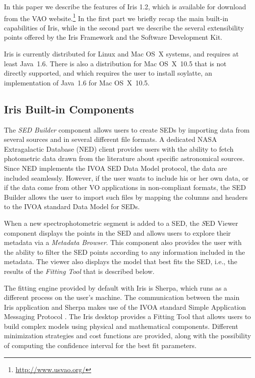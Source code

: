 In this paper we describe the features of Iris 1.2, which is available for download from the VAO website.\footnote{\url{http://www.usvao.org/}} In the first part we briefly recap the main built-in capabilities of Iris, while in the second part we describe the several extensibility points offered by the Iris Framework and the Software Development Kit.

Iris is currently distributed for Linux and Mac OS~X systems, and requires at least Java~1.6. There is also a distribution for Mac OS~X~10.5 that is not directly supported, and which requires the user to install soylatte, an implementation of Java~1.6 for Mac OS~X~10.5.

\subsection{Iris Built-in Components}
The \emph{SED Builder} component allows users to create SEDs by importing data from several sources and in several different file formats. A dedicated NASA Extragalactic Database (NED) client provides users with the ability to fetch photometric data drawn from the literature about specific astronomical sources. Since NED implements the IVOA SED Data Model protocol, the data are included seamlessly. However, if the user wants to include his or her own data, or if the data come from other VO applications in non-compliant formats, the SED Builder allows the user to import such files by mapping the columns and headers to the IVOA standard Data Model for SEDs.

When a new spectrophotometric segment is added to a SED, the {\emph SED Viewer} component displays the points in the SED and allows users to explore their metadata via a \emph{Metadata Browser}.  This component also provides the user with the ability to filter the SED points according to any information included in the metadata.
The viewer also displays the model that best fits the SED, i.e., the results of the \emph{Fitting Tool} that is described below.

The fitting engine provided by default with Iris is Sherpa, which runs as a different process on the user's machine. The communication between the main Iris application and Sherpa makes use of the IVOA standard Simple Application Messaging Protocol \citep[SAMP;][]{samp1.3}.
The Iris desktop provides a Fitting Tool that allows users to build complex models using physical and mathematical components. Different minimization strategies and cost functions are provided, along with the possibility of computing the confidence interval for the best fit parameters.

